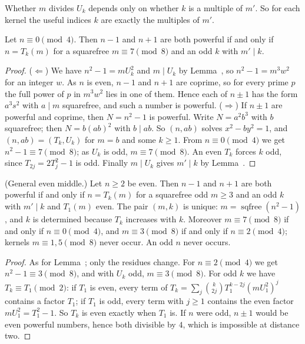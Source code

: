 \inwords Whether $m$ divides $U_k$ depends only on whether $k$ is a multiple of $m'$. So for each kernel the useful indices $k$ are
exactly the multiples of $m'$.

\begin{lemma}
Let $n \equiv 0 \pmod 4$. Then $n - 1$ and $n + 1$ are both powerful if and only if $n = T_k(m)$ for a squarefree $m \equiv 7 \pmod 8$ and
an odd $k$ with $m' \mid k$.
\end{lemma}

\begin{proof}
($\Leftarrow$) We have $n^2 - 1 = m U_k^2$ and $m \mid U_k$ by Lemma~, so $n^2 - 1 = m^3 w^2$ for an integer $w$. As $n$ is
even, $n - 1$ and $n + 1$ are coprime, so for every prime $p$ the full power of $p$ in $m^3 w^2$ lies in one of them. Hence each of
$n \pm 1$ has the form $a^3 s^2$ with $a \mid m$ squarefree, and such a number is powerful.
($\Rightarrow$) If $n \pm 1$ are powerful and coprime, then $N = n^2 - 1$ is powerful. Write $N = a^2 b^3$ with $b$ squarefree; then
$N = b (ab)^2$ with $b \mid ab$. So $(n, ab)$ solves $x^2 - b y^2 = 1$, and $(n, ab) = (T_k, U_k)$ for $m = b$ and some $k \ge 1$. From
$n \equiv 0 \pmod 4$ we get $n^2 - 1 \equiv 7 \pmod 8$; as $U_k$ is odd, $m \equiv 7 \pmod 8$. An even $T_k$ forces $k$ odd, since
$T_{2j} = 2T_j^2 - 1$ is odd. Finally $m \mid U_k$ gives $m' \mid k$ by Lemma~.
\end{proof}

\begin{lemma}
(General even middle.) Let $n \ge 2$ be even. Then $n - 1$ and $n + 1$ are both powerful if and only if $n = T_k(m)$ for a squarefree odd $m \ge 3$ and an odd $k$
with $m' \mid k$ and $T_1(m)$ even. The pair $(m, k)$ is unique: $m = \operatorname{sqfree}(n^2 - 1)$, and $k$ is determined because $T_k$
increases with $k$. Moreover $m \equiv 7 \pmod 8$ if and only if $n \equiv 0 \pmod 4$, and $m \equiv 3 \pmod 8$ if and only if
$n \equiv 2 \pmod 4$; kernels $m \equiv 1, 5 \pmod 8$ never occur. An odd $n$ never occurs.
\end{lemma}

\begin{proof}
As for Lemma~; only the residues change. For $n \equiv 2 \pmod 4$ we get $n^2 - 1 \equiv 3 \pmod 8$, and with $U_k$ odd,
$m \equiv 3 \pmod 8$. For odd $k$ we have $T_k \equiv T_1 \pmod 2$: if $T_1$ is even, every term of
$T_k = \sum_j \binom{k}{2j} T_1^{k-2j} (m U_1^2)^j$ contains a factor $T_1$; if $T_1$ is odd, every term with $j \ge 1$ contains the even
factor $m U_1^2 = T_1^2 - 1$. So $T_k$ is even exactly when $T_1$ is. If $n$ were odd, $n \pm 1$ would be even powerful numbers, hence both
divisible by $4$, which is impossible at distance two.
\end{proof}

